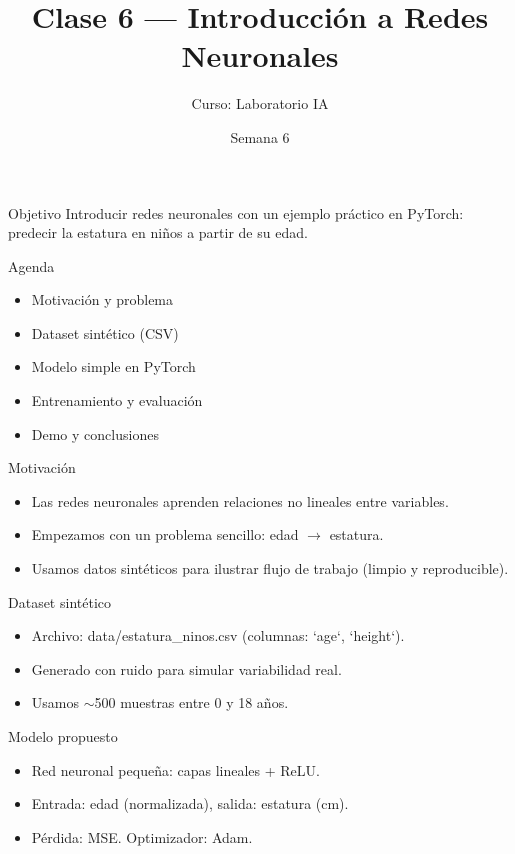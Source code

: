 \documentclass{beamer}
\title{Clase 6 — Introducción a Redes Neuronales}
\author{Curso: Laboratorio IA}
\date{Semana 6}
\begin{document}
\frame{\titlepage}

\begin{frame}{Objetivo}
  Introducir redes neuronales con un ejemplo práctico en PyTorch: predecir la estatura en niños a partir de su edad.
\end{frame}

\begin{frame}{Agenda}
  \begin{itemize}
    \item Motivación y problema
    \item Dataset sintético (CSV)
    \item Modelo simple en PyTorch
    \item Entrenamiento y evaluación
    \item Demo y conclusiones
  \end{itemize}
\end{frame}

\begin{frame}{Motivación}
  \begin{itemize}
    \item Las redes neuronales aprenden relaciones no lineales entre variables.
    \item Empezamos con un problema sencillo: edad $\rightarrow$ estatura.
    \item Usamos datos sintéticos para ilustrar flujo de trabajo (limpio y reproducible).
  \end{itemize}
\end{frame}

\begin{frame}{Dataset sintético}
  \begin{itemize}
    \item Archivo: data/estatura_ninos.csv (columnas: `age`, `height`).
    \item Generado con ruido para simular variabilidad real.
    \item Usamos $\sim$500 muestras entre 0 y 18 años.
  \end{itemize}
\end{frame}

\begin{frame}{Modelo propuesto}
  \begin{itemize}
    \item Red neuronal pequeña: capas lineales + ReLU.
    \item Entrada: edad (normalizada), salida: estatura (cm).
    \item Pérdida: MSE. Optimizador: Adam.
  \end{itemize}
\end{frame}
\end{document}
